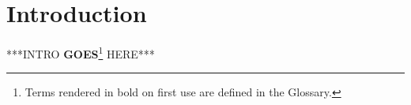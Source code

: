 \section{Introduction}
%
%
% 
***INTRO {\bf GOES}\footnote{Terms rendered in bold on first use are defined in the Glossary.} HERE*** \citep{society_of_mind}


